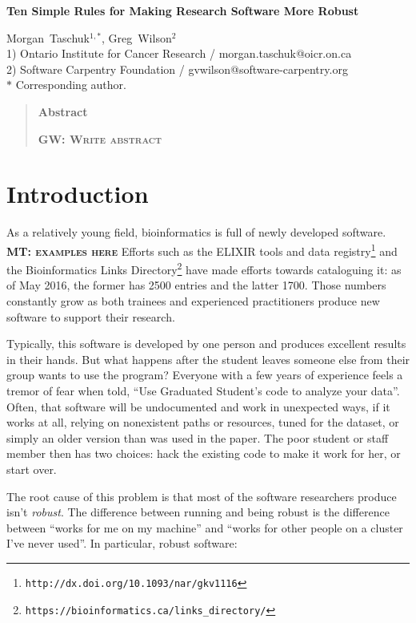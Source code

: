 \documentclass[10pt]{article}
\date{}
\newcommand{\fixme}[2]{\textsc{\textbf{{#1}: {#2}}}}
\newcommand{\withurl}[2]{{#1}\footnote{\texttt{#2}}}
\begin{document}
\begin{flushleft}
{\Large
\textbf{Ten Simple Rules for Making Research Software More Robust}
}

{Morgan~Taschuk}$^{1,\ast}$,
{Greg~Wilson}$^{2}$
\\
1) Ontario Institute for Cancer Research / morgan.taschuk@oicr.on.ca
\\
2) Software Carpentry Foundation / gvwilson@software-carpentry.org
\\
$\ast$ Corresponding author.
\end{flushleft}


\begin{quote}
\begin{center}\textbf{Abstract}\end{center}
\fixme{GW}{Write abstract}
\end{quote}

\section*{Introduction}

As a relatively young field, bioinformatics is full of newly developed software.
\fixme{MT}{examples here}
Efforts such as
\withurl{the ELIXIR tools and data registry}{http://dx.doi.org/10.1093/nar/gkv1116}
and the
\withurl{Bioinformatics Links Directory}{https://bioinformatics.ca/links\_directory/}
\cite{brazas2012}
have made efforts towards cataloguing it: as of May 2016, the former
has 2500 entries and the latter 1700. Those numbers constantly
grow as both trainees and experienced practitioners produce new
software to support their research.

Typically, this software is developed by one person and 
produces excellent results in their hands. But what happens after the
student leaves someone else from their group wants to use the program? Everyone with
a few years of experience feels a tremor of fear when told, ``Use
Graduated Student's code to analyze your
data''. Often, that software will be undocumented and work in unexpected
ways, if it works at all, relying on nonexistent paths or resources, tuned for
the dataset, or simply an older version than was used in the paper.
The poor student or staff member then has two choices: hack the existing code
to make it work for her, or start over.

The root cause of this problem is that most of the software researchers
produce isn't \emph{robust}. The difference between running and being
robust is the difference between ``works for me on my machine'' and
``works for other people on a cluster I've never used''. In particular,
robust software:
\end{document}
